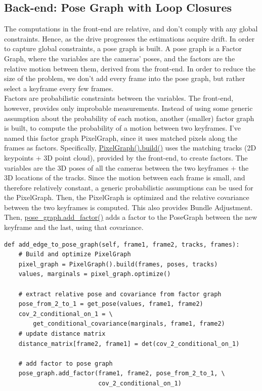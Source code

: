 \documentclass[12pt]{article}
\begin{document}
\subsection{Back-end: Pose Graph with Loop Closures}
The computations in the front-end are relative, and don't comply with any global constraints.
Hence, as the drive progresses the estimations acquire drift. In order to capture global constraints, a pose graph is built. A pose graph is a Factor Graph, where the variables are the cameras' poses, and the factors are the relative motion between them, derived from the front-end. In order to reduce the size of the problem, we don't add every frame into the pose graph, but rather select a keyframe every few frames. \\
Factors are probabilistic constraints between the variables. The front-end, however, provides only
improbable measurements. Instead of using some generic assumption about the probability of each motion, another (smaller) factor graph is built, to compute the probability of a motion between two keyframes. I've named this factor graph PixelGraph, since it uses matched pixels along the frames as factors. Specifically, \href{https://github.com/ehud-gordon/VAN_ex/blob/master/src/factor_graph/pixel_graph.py#L20}{PixelGraph().build()} uses the matching tracks (2D keypoints + 3D point cloud), provided by the front-end, to create factors. The variables are the 3D poses of all the cameras between the two keyframes + the 3D locations of the tracks. Since the motion between each frame is small, and therefore relatively constant, a generic probabilistic assumptions can be used for the PixelGraph. Then, the PixelGraph is optimized and the relative covariance between the two keyframes is computed. This also provides Bundle Adjustment. Then, \href{https://github.com/ehud-gordon/VAN_ex/blob/master/src/factor_graph/pose_graph.py#L22}{pose_graph.add_factor()} adds a factor to the PoseGraph between the new keyframe and the last, using that covariance. 
\begin{tcolorbox}
\begin{verbatim}  
def add_edge_to_pose_graph(self, frame1, frame2, tracks, frames):
    # Build and optimize PixelGraph
    pixel_graph = PixelGraph().build(frames, poses, tracks)
    values, marginals = pixel_graph.optimize()
    
    # extract relative pose and covariance from factor graph
    pose_from_2_to_1 = get_pose(values, frame1, frame2)
    cov_2_conditional_on_1 = \
        get_conditional_covariance(marginals, frame1, frame2)
    # update distance matrix
    distance_matrix[frame2, frame1] = det(cov_2_conditional_on_1)
    
    # add factor to pose graph
    pose_graph.add_factor(frame1, frame2, pose_from_2_to_1, \
                          cov_2_conditional_on_1)

\end{verbatim}
\end{tcolorbox}
\end{document}
